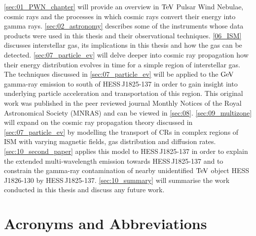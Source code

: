 \autoref{sec:01_PWN_chapter} will provide an overview in $\TeV$ Pulsar Wind Nebulae, cosmic rays and the processes in which cosmic rays convert their energy into gamma rays. \autoref{sec:02_astronomy} describes some of the instruments whose data products were used in this thesis and their observational techniques. \autoref{06_ISM} discusses interstellar gas, its implications in this thesis and how the gas can be detected. \autoref{sec:07_particle_ev} will delve deeper into cosmic ray propagation how their energy distribution evolves in time for a simple region of interstellar gas. The techniques discussed in \autoref{sec:07_particle_ev} will be applied to the $\si{\giga\electronvolt}$ gamma-ray emission to south of \mbox{HESS\,J1825-137} in order to gain insight into underlying particle acceleration and transportation of this region. This original work was published in the peer reviewed journal Monthly Notices of the Royal Astronomical Society (MNRAS) and can be viewed in \autoref{sec:08}. \autoref{sec:09_multizone} will expand on the cosmic ray propagation theory discussed in \autoref{sec:07_particle_ev} by modelling the transport of CRs in complex regions of ISM with varying magnetic fields, gas distribution and diffusion rates. \autoref{sec:10_second_paper} applies this model to \mbox{HESS\,J1825-137} in order to explain the extended multi-wavelength emission towards \mbox{HESS\,J1825-137} and to constrain the gamma-ray contamination of nearby unidentified $\TeV$ object \mbox{HESS\,J1826-130} by \mbox{HESS\,J1825-137}. \autoref{sec:10_summary} will summarise the work conducted in this thesis and discuss any future work.

\section*{Acronyms and Abbreviations}

